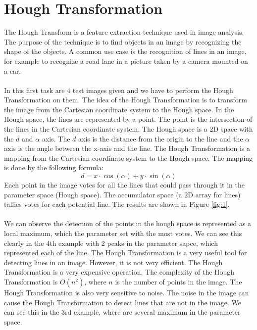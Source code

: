 \documentclass[12pt
,headinclude
,headsepline
,bibtotocnumbered
]{scrartcl}
\begin{document}
\section*{Hough Transformation}
The Hough Transform is a feature extraction technique used in image analysis. The purpose of the technique is to find objects in an image by recognizing the shape of the objects. A common use case is the recognition of lines in an image, for example to recognize a road lane in a picture taken by a camera mounted on a car.
\\\\ In this first task are 4 test images given and we have to perform the Hough Transformation on them. The idea of the Hough Transformation is to transform the image from the Cartesian coordinate system to the Hough space. In the Hough space, the lines are represented by a point. The point is the intersection of the lines in the Cartesian coordinate system. The Hough space is a 2D space with the $d$ and $\alpha$ axis. The $d$ axis is the distance from the origin to the line and the $\alpha$ axis is the angle between the x-axis and the line. The Hough Transformation is a mapping from the Cartesian coordinate system to the Hough space. The mapping is done by the following formula:
\begin{equation*}
d = x \cdot \cos(\alpha) + y \cdot \sin(\alpha)
\end{equation*}
Each point in the image votes for all the lines that could pass through it in the parameter space (Hough space). The accumulator space (a 2D array for lines) tallies votes for each potential line. The results are shown in Figure \ref{fig:1}.
\\\\ We can observe the detection of the points in the hough space is represented as a local maximum, which the parameter set with the most votes. We can see this clearly in the 4th example with 2 peaks in the parameter sapce, which represented each of the line. The Hough Transformation is a very useful tool for detecting lines in an image. However, it is not very efficient. The Hough Transformation is a very expensive operation. The complexity of the Hough Transformation is $O(n^2)$, where $n$ is the number of points in the image. The Hough Transformation is also very sensitive to noise. The noise in the image can cause the Hough Transformation to detect lines that are not in the image. We can see this in the 3rd example, where are several maximum in the parameter space.
\end{document}
